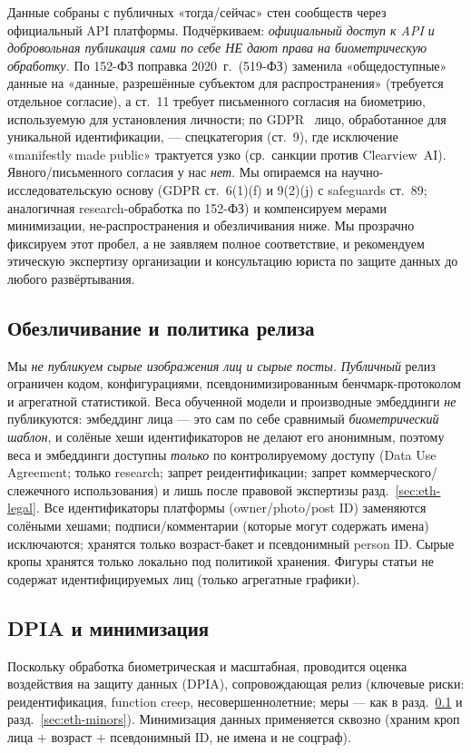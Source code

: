 \documentclass[journal]{IEEEtran}
\begin{document}
Данные собраны с публичных «тогда/сейчас» стен сообществ через официальный API платформы. Подчёркиваем: \emph{официальный доступ к API и добровольная публикация сами по себе НЕ дают права на биометрическую обработку.} По 152-ФЗ поправка 2020~г.\ (519-ФЗ) заменила «общедоступные» данные на «данные, разрешённые субъектом для распространения» (требуется отдельное согласие), а ст.~11 требует письменного согласия на биометрию, используемую для установления личности; по GDPR~\cite{gdpr2016} лицо, обработанное для уникальной идентификации, --- спецкатегория (ст.~9), где исключение «manifestly made public» трактуется узко (ср.\ санкции против Clearview~AI). Явного/письменного согласия у нас \emph{нет}. Мы опираемся на научно-исследовательскую основу (GDPR ст.~6(1)(f) и 9(2)(j) с safeguards ст.~89; аналогичная research-обработка по 152-ФЗ) и компенсируем мерами минимизации, не-распространения и обезличивания ниже. Мы прозрачно фиксируем этот пробел, а не заявляем полное соответствие, и рекомендуем этическую экспертизу организации и консультацию юриста по защите данных до любого развёртывания.

\subsection{Обезличивание и политика релиза}\label{sec:eth-deid}
Мы \emph{не публикуем сырые изображения лиц и сырые посты.} \emph{Публичный} релиз ограничен кодом, конфигурациями, псевдонимизированным бенчмарк-протоколом и агрегатной статистикой. Веса обученной модели и производные эмбеддинги \emph{не} публикуются: эмбеддинг лица --- это сам по себе сравнимый \emph{биометрический шаблон}, и солёные хеши идентификаторов не делают его анонимным, поэтому веса и эмбеддинги доступны \emph{только} по контролируемому доступу (Data Use Agreement; только research; запрет реидентификации; запрет коммерческого/слежечного использования) и лишь после правовой экспертизы разд.~\ref{sec:eth-legal}. Все идентификаторы платформы (owner/photo/post ID) заменяются солёными хешами; подписи/комментарии (которые могут содержать имена) исключаются; хранятся только возраст-бакет и псевдонимный person ID. Сырые кропы хранятся только локально под политикой хранения. Фигуры статьи не содержат идентифицируемых лиц (только агрегатные графики).

\subsection{DPIA и минимизация}\label{sec:eth-dpia}
Поскольку обработка биометрическая и масштабная, проводится оценка воздействия на защиту данных (DPIA), сопровождающая релиз (ключевые риски: реидентификация, function creep, несовершеннолетние; меры --- как в разд.~\ref{sec:eth-deid} и разд.~\ref{sec:eth-minors}). Минимизация данных применяется сквозно (храним кроп лица $+$ возраст $+$ псевдонимный ID, не имена и не соцграф).
\end{document}
